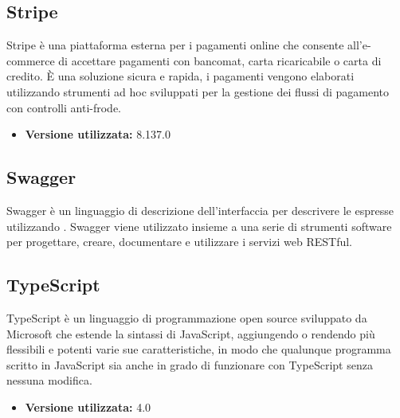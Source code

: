 \subsection{Stripe}
Stripe è una piattaforma esterna per i pagamenti online che consente all'e-commerce di accettare pagamenti con bancomat, carta ricaricabile o carta di credito. È una soluzione sicura e rapida, i pagamenti vengono elaborati utilizzando strumenti ad hoc sviluppati per la gestione dei flussi di pagamento con controlli anti-frode.
\begin{itemize}
    \item \textbf{Versione utilizzata:} 8.137.0
\end{itemize}
\subsection{Swagger}
Swagger è un linguaggio di descrizione dell'interfaccia per descrivere le   espresse utilizzando . Swagger viene utilizzato insieme a una serie di strumenti software  per progettare, creare, documentare e utilizzare i servizi web RESTful.
\subsection{TypeScript}
TypeScript è un linguaggio di programmazione open source sviluppato da Microsoft che estende la sintassi di JavaScript, aggiungendo o rendendo più flessibili e potenti varie sue caratteristiche, in modo che qualunque programma scritto in JavaScript sia anche in grado di funzionare con TypeScript senza nessuna modifica.
\begin{itemize}
    \item \textbf{Versione utilizzata:} 4.0
\end{itemize}